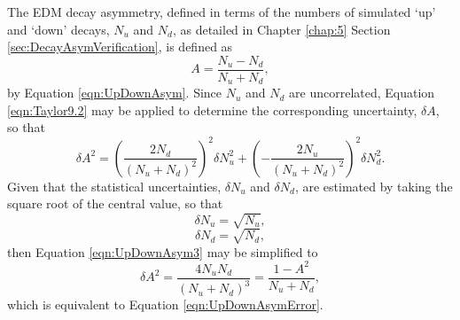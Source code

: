 \begin{appendices}
The EDM decay asymmetry, defined in terms of the numbers of simulated `up' and `down' decays, $N_{u}$ and $N_{d}$, as detailed in Chapter \ref{chap:5} Section \ref{sec:DecayAsymVerification}, is defined as 
%
\begin{equation}
  A = \frac{N_{u}-N_{d}}{N_{u}+N_{d}},
  \label{eqn:UpDownAsym2}
\end{equation}
%
by Equation \ref{eqn:UpDownAsym}. Since $N_{u}$ and $N_{d}$ are uncorrelated, Equation \ref{eqn:Taylor9.2} may be applied to determine the corresponding uncertainty, $\delta A$, so that
%
\begin{equation}
  \delta A^{2} = \left(\frac{2N_{d}}{(N_{u}+N_{d})^{2}}\right)^{2}\delta N_{u}^{2} + \left(-\frac{2N_{u}}{(N_{u}+N_{d})^{2}}\right)^{2}\delta N_{d}^{2}. 
  \label{eqn:UpDownAsym3}
\end{equation}
%
Given that the statistical uncertainties, $\delta N_{u}$ and $\delta N_{d}$, are estimated by taking the square root of the central value, so that 
%
\begin{equation}
   \delta N_{u} = \sqrt{N_{u}},
\end{equation}
\begin{equation}
   \delta N_{d} = \sqrt{N_{d}},
\end{equation}
%
then Equation \ref{eqn:UpDownAsym3} may be simplified to
%
\begin{equation}
  \delta A^{2} = \frac{4N_{u}N_{d}}{(N_{u}+N_{d})^{3}} = \frac{1-A^{2}}{N_{u}+N_{d}}, 
\end{equation}
%
which is equivalent to Equation \ref{eqn:UpDownAsymError}. 

\end{appendices}